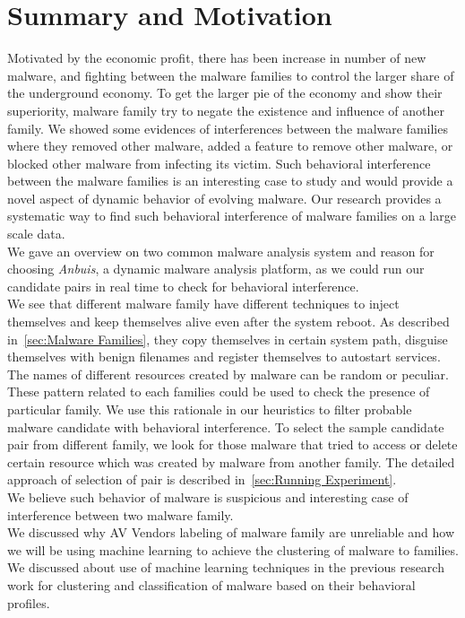 \section{Summary and Motivation}
\label{sec:Motivation}
Motivated by the economic profit, there has been increase in number of new malware, and fighting between the malware families to control the larger share of the underground economy.
To get the larger pie of the economy and show their superiority, malware family try to negate the existence and influence of another family.
We showed some evidences of interferences between the malware families where they removed other malware, added a feature to remove other malware, or blocked other malware from infecting its victim.
Such behavioral interference between the malware families is an interesting case to study and would provide a novel aspect of dynamic behavior of evolving malware.
Our research provides a systematic way to find such behavioral interference of malware families on a large scale data.
\\
We gave an overview on two common malware analysis system and reason for choosing \emph{Anbuis}, a dynamic malware analysis platform, as we could run our candidate pairs in real time to check for behavioral interference.\\
We see that different malware family have different techniques to inject themselves and keep themselves alive even after the system reboot.
As described in~\autoref{sec:Malware Families}, they copy themselves in certain system path, disguise themselves with benign filenames and register themselves to autostart services.
The names of different resources created by malware can be random or peculiar.
These pattern related to each families could be used to check the presence of particular family.
We use this rationale in our heuristics to filter probable malware candidate with behavioral interference.
To select the sample candidate pair from different family, we look for those malware that tried to access or delete certain resource which was created by malware from another family.
The detailed approach of selection of pair is described in~\autoref{sec:Running Experiment}.\\
We believe such behavior of malware is suspicious and interesting case of interference between two malware family.\\
We discussed why AV Vendors labeling of malware family are unreliable and how we will be using machine learning to achieve the clustering of malware to families.
We discussed about use of machine learning techniques in the previous research work for clustering and classification of malware based on their behavioral profiles.
